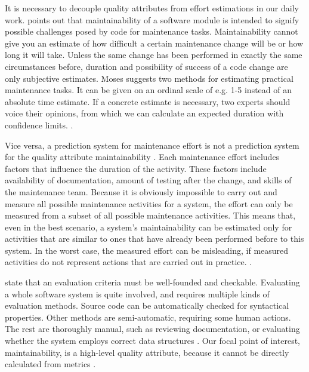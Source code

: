 \documentclass[utf8,english]{gradu3}
\begin{document}
It is necessary to decouple quality attributes from effort estimations in our
daily work. \textcite{Moses2009} points out that maintainability of a software
module is intended to signify possible challenges posed by code for maintenance
tasks. Maintainability cannot give you an estimate of how difficult a certain
maintenance change will be or how long it will take. Unless the same change has
been performed in exactly the same circumstances before, duration and
possibility of success of a code change are only subjective estimates.
Moses suggests two methods for estimating practical maintenance tasks. It can be
given on an ordinal scale of e.g. 1-5 instead of an absolute time estimate. If a
concrete estimate is necessary, two experts should voice their opinions, from
which we can calculate an expected duration with confidence limits.
\parencite[204]{Moses2009}.

Vice versa, a prediction system for maintenance effort is not a prediction
system for the quality attribute maintainability \parencite[206]{Moses2009}. Each
maintenance effort includes factors that influence the duration of the activity.
These factors include availability of documentation, amount of testing after the
change, and skills of the maintenance team. Because it is obviously impossible
to carry out and measure all possible maintenance activities for a system, the
effort can only be measured from a subset of all possible maintenance
activities. This means that, even in the best scenario, a system's
maintainability can be estimated only for activities that are similar to ones
that have already been performed before to this system. In the worst case, the
measured effort can be misleading, if measured activities do not represent
actions that are carried out in practice. \parencite[206]{Moses2009}.

\textcite{Broy2006} state that an evaluation criteria must be well-founded and
checkable. Evaluating a whole software system is quite involved, and requires
multiple kinds of evaluation methods. Source code can be automatically checked
for syntactical properties. Other methods are semi-automatic, requiring some
human actions. The rest are thoroughly manual, such as reviewing documentation,
or evaluating whether the system employs correct data structures \parencite[22]{Broy2006}.
Our focal point of interest, maintainability, is a high-level quality
attribute, because it cannot be directly calculated from metrics \parencite[60]{Arvanitou2017}.
\end{document}
